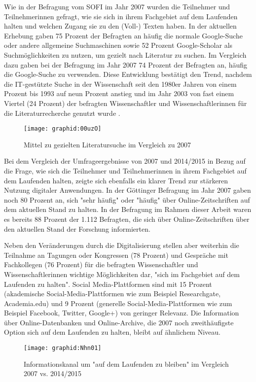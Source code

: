 Wie in der Befragung vom SOFI im Jahr 2007 wurden die Teilnehmer und Teilnehmerinnen gefragt, wie sie sich in ihrem Fachgebiet auf dem Laufenden halten und welchen Zugang sie zu den (Voll-) Texten haben. In der aktuellen Erhebung gaben 75 Prozent der Befragten an häufig die normale Google-Suche oder andere allgemeine Suchmaschinen sowie 52 Prozent Google-Scholar als Suchmöglichkeiten zu nutzen, um gezielt nach Literatur zu suchen. Im Vergleich dazu gaben bei der Befragung im Jahr 2007 74 Prozent der Befragten an, häufig die Google-Suche zu verwenden. Diese Entwicklung bestätigt den Trend, nachdem die IT-gestützte Suche in der Wissenschaft seit den 1980er Jahren von einem Prozent bis 1993 auf neun Prozent anstieg und im Jahr 2003 von fast einem Viertel (24 Prozent) der befragten Wissenschaftler und Wissenschaftlerinnen für die Literaturrecherche genutzt wurde \cite{hanekop_2008}.

\begin{figure}[h!]
\texttt{[image: graphid:00uzO]}
\caption{Mittel zu gezielten Literatursuche im Vergleich zu 2007}
\end{figure}

Bei dem Vergleich der Umfrageergebnisse von 2007 und 2014/2015 in Bezug auf die Frage, wie sich die Teilnehmer und Teilnehmerinnen in ihrem Fachgebiet auf dem Laufenden halten, zeigte sich ebenfalls ein klarer Trend zur stärkeren Nutzung digitaler Anwendungen. In der Göttinger Befragung im Jahr 2007 gaben noch 80 Prozent an, sich "sehr häufig" oder "häufig" über Online-Zeitschriften auf dem aktuellen Stand zu halten. In der Befragung im Rahmen dieser Arbeit waren es bereits 88 Prozent der 1.112 Befragten, die sich über Online-Zeitschriften über den aktuellen Stand der Forschung informierten.

Neben den Veränderungen durch die Digitalisierung stellen aber weiterhin die Teilnahme an Tagungen oder Kongressen (78 Prozent) und Gespräche mit Fachkollegen (76 Prozent) für die befragten Wissenschaftler und Wissenschaftlerinnen wichtige Möglichkeiten dar, "sich im Fachgebiet auf dem Laufenden zu halten". Social Media-Plattformen sind mit 15 Prozent (akademische Social-Media-Plattformen wie zum Beispiel Researchgate, Academia.edu) und  9 Prozent (generelle Social-Media-Plattformen wie zum Beispiel Facebook, Twitter, Google+) von geringer Relevanz. Die Information über Online-Datenbanken und Online-Archive, die 2007 noch zweithäufigste Option sich auf dem Laufenden zu halten, bleibt auf ähnlichem Niveau.

\begin{figure}[h!]
\texttt{[image: graphid:Nhn01]}
\caption{Informationskanal um "auf dem Laufenden zu bleiben" im Vergleich 2007 vs. 2014/2015}
\end{figure}

